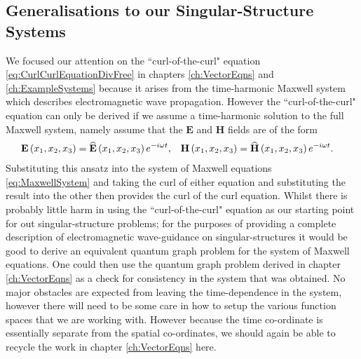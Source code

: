 \subsection{Generalisations to our Singular-Structure Systems} \label{sec:ConcFutureMaxwell}
We focused our attention on the ``curl-of-the-curl" equation \eqref{eq:CurlCurlEquationDivFree} in chapters \ref{ch:VectorEqns} and \ref{ch:ExampleSystems} because it arises from the time-harmonic Maxwell system which describes electromagnetic wave propagation.
However the ``curl-of-the-curl" equation can only be derived if we assume a time-harmonic solution to the full Maxwell system, namely assume that the $\mathbf{E}$ and $\mathbf{H}$ fields are of the form
\begin{align*}
	\mathbf{E}\left( x_1,x_2,x_3 \right) = \widehat{\mathbf{E}}\left( x_1,x_2,x_3 \right)e^{-i\omega t}, 
	&\quad  \mathbf{H}\left( x_1,x_2,x_3 \right) = \widehat{\mathbf{H}}\left( x_1,x_2,x_3 \right)e^{-i\omega t}.
\end{align*}
Substituting this ansatz into the system of Maxwell equations \eqref{eq:MaxwellSystem} and taking the curl of either equation and substituting the result into the other then provides the curl of the curl equation.
Whilst there is probably little harm in using the ``curl-of-the-curl" equation as our starting point for out singular-structure problems; for the purposes of providing a complete description of electromagnetic wave-guidance on singular-structures it would be good to derive an equivalent quantum graph problem for the system of Maxwell equations.
One could then use the quantum graph problem derived in chapter \ref{ch:VectorEqns} as a check for consistency in the system that was obtained.
No major obstacles are expected from leaving the time-dependence in the system, however there will need to be some care in how to setup the various function spaces that we are working with.
However because the time co-ordinate is essentially separate from the spatial co-ordinates, we should again be able to recycle the work in chapter \ref{ch:VectorEqns} here. \newline

